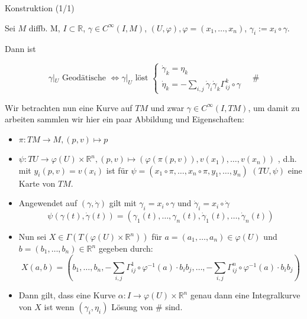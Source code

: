 \documentclass[a6paper,11pt,grid=front]{kartei}
\newcommand{\fl}[1]{\begin{flushleft}
 #1 \end{flushleft}}
\newcommand{\R}{\mathbb{R}}
\begin{document}
\nonameyet
{Konstruktion} {(1/1)}
{
\vspace{-2.8em}
\scriptsize
Sei $M$ diffb. M, $I \subset \R$, $\gamma \in C^\infty(I,M)$, 
$(U,\varphi), \varphi = (x_1,\dots,x_n)$, $\gamma_i := x_i \circ \gamma$. 
\fl{Dann ist }
\vspace{-2em}
\[
\gamma|_U \text{ Geodätische } \Leftrightarrow
\gamma|_{U} \text{ löst }
\begin{cases}
\dot \gamma_k = \eta_k
\\
\dot \eta_k = -\sum_{i,j} \dot \gamma_i \dot \gamma_k \Gamma^k_{ij} \circ \gamma
\end{cases}
\quad \#
\]
\fl{Wir betrachten nun eine Kurve auf $TM$ und zwar $\gamma \in C^\infty(I,TM)$,
um damit zu arbeiten sammlen wir hier ein paar Abbildung und Eigenschaften:}
\begin{itemize}[$\mathbf{\cdot}$]
\item $\pi: TM \to M, (p,v) \mapsto p$ 
\item 
$\psi : TU \to \varphi(U) \times \R^n, 
(p,v) \mapsto 
(
\varphi(\pi(p,v)),
v(x_1),\dots,v(x_n))$
, d.h. mit $y_i(p,v) = v(x_i)$ 
ist für $\psi = (x_1\circ \pi,\dots,x_n\circ \pi,y_1,\dots,y_n)$ $(TU,\psi)$
eine Karte von $TM$.
\item Angewendet auf $(\gamma,\dot \gamma)$ gilt mit $\gamma_i = x_i \circ \gamma$
und $\dot \gamma_i = x_i \circ \dot \gamma$
\[
\psi (\gamma(t),\dot \gamma(t)) =  (\gamma_1(t),\dots,\gamma_n(t),
\dot \gamma_1(t),\dots, \dot \gamma_n(t))
\]
\item Nun sei $X\in \Gamma(T(\varphi(U) \times \R^n))$ für 
$a = (a_1,\dots,a_n)\in\varphi(U)$ und $b = (b_1,\dots,b_n)\in \R^n$ gegeben 
durch: 
\[
X(a,b) = 
(b_1,\dots,b_n,-\sum_{i,j} \Gamma^1_{ij}\circ \varphi^{-1}(a) \cdot b_ib_j,
\dots, -\sum_{i,j} \Gamma^n_{ij}\circ \varphi^{-1}(a) \cdot b_ib_j)
\]
\vspace{-2.2em}
\item Dann gilt, dass eine Kurve $\alpha:I \to \varphi(U) \times \R^n$ genau dann eine 
Integralkurve von $X$ ist wenn $(\gamma_i,\eta_i)$ Lösung von $\#$ sind.
\end{itemize}
}
{}
\end{document}
